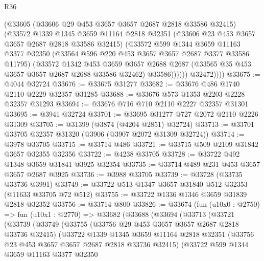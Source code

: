 \begin{lexlean}{R36}
\begin{coremodule}
                (@33605
                  (@33606 @29 @453 @3657 @3657 @2687 @2818 @33586 @32415)
                  (@33572
                    @1339
                    @1345
                    @3659
                    @11164
                    @2818
                    @32351
                    (@33606 @23 @453 @3657 @3657 @2687 @2818 @33586 @32415)
                    (@33572
                      @599
                      @1344
                      @3659
                      @11163
                      @3377
                      @32350
                      (@33564 @596 @220 @453 @3657 @3657 @2687 @3377 @33586 @11795)
                      (@33572
                        @1342
                        @453
                        @3659
                        @3657
                        @2688
                        @2687
                        (@33565 @35 @453 @3657 @3657 @2687 @2688 @33586 @32462)
                        @33586))))))
            @32472))))
@33675 := @4044 @32724
@33676 := @33675 @31277
@33682 := @33676 @486 @1740 @2110 @2229 @32357 @31285
@33688 := @33676 @573 @1353 @2203 @2228 @32357 @31293
@33694 := @33676 @716 @710 @2110 @2227 @32357 @31301
@33695 := @3941 @32724
@33701 := @33695 @31277 @727 @2072 @2110 @2226 @31309
@33705 := @31399 (@3874 (@4204 @2851) @32724)
@33713 := @33701 @33705 @32357 @31320 (@3906 (@3907 @2072 @31309 @32724))
@33714 := @3978 @33705
@33715 := @33714 @486
@33721 := @33715 @509 @2109 @31842 @3657 @32355 @32356
@33722 := @4238 @33705
@33728 := @33722 @492 @1348 @3659 @31841 @3925 @32354
@33735 := @33714 @489 @231 @453 @3657 @3657 @2687 @3925
@33736 := @3988 @33705
@33739 := @33728 (@33735 @33736 @3991)
@33749 := @33722 @513 @1347 @3657 @31840 @512 @32353 (@11633 @33705 @72 @512)
@33755 := @33722 @1336 @1346 @3659 @31839 @2818 @32352
@33756 := @33714 @800
@33826 := @33674
    (fun (u10x0 : @2750) =>
    fun (u10x1 : @2770) =>
    @33682
      (@33688
        (@33694
          (@33713
            (@33721
              (@33739
                (@33749
                  (@33755
                    (@33756 @29 @453 @3657 @3657 @2687 @2818 @33736 @32415)
                    (@33722
                      @1339
                      @1345
                      @3659
                      @11164
                      @2818
                      @32351
                      (@33756 @23 @453 @3657 @3657 @2687 @2818 @33736 @32415)
                      (@33722
                        @599
                        @1344
                        @3659
                        @11163
                        @3377
                        @32350

\end{coremodule}
\end{lexlean}
